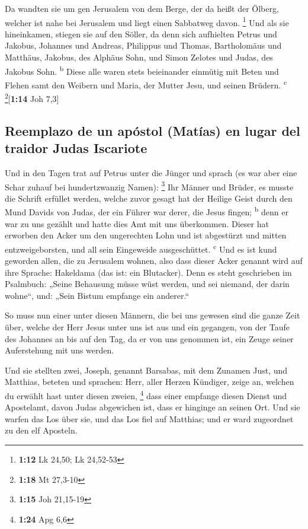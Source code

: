  Da wandten sie um gen Jerusalem von dem Berge, der da
heißt der Ölberg, welcher ist nahe bei Jerusalem und liegt einen
Sabbatweg davon. \footnote{\textbf{1:12} Lk 24,50; Lk 24,52-53}
 Und als sie hineinkamen, stiegen sie auf den Söller, da
denn sich aufhielten Petrus und Jakobus, Johannes und Andreas, Philippus
und Thomas, Bartholomäus und Matthäus, Jakobus, des Alphäus Sohn, und
Simon Zelotes und Judas, des Jakobus Sohn. \textsuperscript{b}
 Diese alle waren stets beieinander einmütig mit Beten
und Flehen samt den Weibern und Maria, der Mutter Jesu, und seinen
Brüdern. \textsuperscript{c} \footnote{\textbf{1:18} Mt 27,3-10}{[}\textbf{1:14}
Joh 7,3{]}

\hypertarget{reemplazo-de-un-apuxf3stol-matuxedas-en-lugar-del-traidor-judas-iscariote}{%
\subsection{Reemplazo de un apóstol (Matías) en lugar del traidor Judas
Iscariote}\label{reemplazo-de-un-apuxf3stol-matuxedas-en-lugar-del-traidor-judas-iscariote}}

 Und in den Tagen trat auf Petrus unter die Jünger und
sprach (es war aber eine Schar zuhauf bei hundertzwanzig Namen):
\footnote{\textbf{1:15} Joh 21,15-19}  Ihr Männer und
Brüder, es musste die Schrift erfüllet werden, welche zuvor gesagt hat
der Heilige Geist durch den Mund Davids von Judas, der ein Führer war
derer, die Jesus fingen; \textsuperscript{b}  denn er war
zu uns gezählt und hatte dies Amt mit uns überkommen. 
Dieser hat erworben den Acker um den ungerechten Lohn und ist abgestürzt
und mitten entzweigeborsten, und all sein Eingeweide ausgeschüttet.
\textsuperscript{c}  Und es ist kund geworden allen, die
zu Jerusalem wohnen, also dass dieser Acker genannt wird auf ihre
Sprache: Hakeldama (das ist: ein Blutacker).  Denn es
steht geschrieben im Psalmbuch: „Seine Behausung müsse wüst werden, und
sei niemand, der darin wohne``, und: „Sein Bistum empfange ein
anderer.``

 So muss nun einer unter diesen Männern, die bei uns
gewesen sind die ganze Zeit über, welche der Herr Jesus unter uns ist
aus und ein gegangen,  von der Taufe des Johannes an bis
auf den Tag, da er von uns genommen ist, ein Zeuge seiner Auferstehung
mit uns werden.

 Und sie stellten zwei, Joseph, genannt Barsabas, mit dem
Zunamen Just, und Matthias,  beteten und sprachen: Herr,
aller Herzen Kündiger, zeige an, welchen du erwählt hast unter diesen
zweien, \footnote{\textbf{1:24} Apg 6,6}  dass einer
empfange diesen Dienst und Apostelamt, davon Judas abgewichen ist, dass
er hinginge an seinen Ort.  Und sie warfen das Los über
sie, und das Los fiel auf Matthias; und er ward zugeordnet zu den elf
Aposteln.

